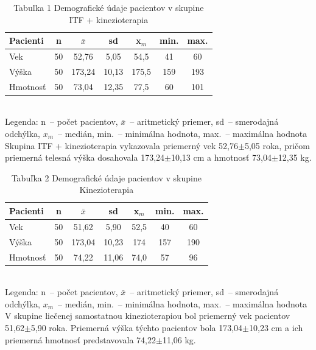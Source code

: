 \begin{table}[H]
\centering
\caption*{Tabuľka 1 Demografické údaje pacientov v skupine ITF + kinezioterapia}
\begin{tabular}{|l|c|c|c|c|c|c|}
\hline
\textbf{Pacienti} & \textbf{n} & \textbf{$\bar{x}$} & \textbf{sd} & \textbf{x$_m$} & \textbf{min.} & \textbf{max.} \\ \hline
Vek & 50 & 52,76 & 5,05 & 54,5 & 41 & 60 \\ \hline
Výška & 50 & 173,24 & 10,13 & 175,5 & 159 & 193 \\ \hline
Hmotnosť & 50 & 73,04 & 12,35 & 77,5 & 60 & 101 \\ \hline
\end{tabular}
\\
\footnotesize{Legenda: n~-- počet pacientov, $\bar{x}$~-- aritmetický priemer, sd~-- smerodajná odchýlka, $x_m$~-- medián, min.~-- minimálna hodnota, max.~-- maximálna hodnota}
\vspace{0.5em}
\newline
Skupina ITF + kinezioterapia vykazovala priemerný vek 52,76$\pm$5,05 roka, pričom priemerná telesná výška dosahovala 173,24$\pm$10,13 cm a hmotnosť 73,04$\pm$12,35 kg.
\label{tab:demografia_itf}
\end{table}

\begin{table}[H]
\centering
\caption*{Tabuľka 2 Demografické údaje pacientov v skupine Kinezioterapia}
\begin{tabular}{|l|c|c|c|c|c|c|}
\hline
\textbf{Pacienti} & \textbf{n} & \textbf{$\bar{x}$} & \textbf{sd} & \textbf{x$_m$} & \textbf{min.} & \textbf{max.} \\ \hline
Vek & 50 & 51,62 & 5,90 & 52,5 & 40 & 60 \\ \hline
Výška & 50 & 173,04 & 10,23 & 174 & 157 & 190 \\ \hline
Hmotnosť & 50 & 74,22 & 11,06 & 74,0 & 57 & 96 \\ \hline
\end{tabular}
\\
\footnotesize{Legenda: n~-- počet pacientov, $\bar{x}$~-- aritmetický priemer, sd~-- smerodajná odchýlka, $x_m$~-- medián, min.~-- minimálna hodnota, max.~-- maximálna hodnota}
\vspace{0.5em}
\newline
V skupine liečenej samostatnou kinezioterapiou bol priemerný vek pacientov 51,62$\pm$5,90 roka. Priemerná výška týchto pacientov bola 173,04$\pm$10,23 cm a ich priemerná hmotnosť predstavovala 74,22$\pm$11,06 kg.
\label{tab:demografia_kin}
\end{table}






